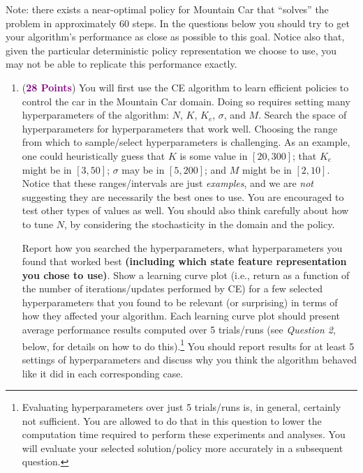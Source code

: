 \documentclass{article}
\newcommand{\POINTS}[1]{\textcolor{purple}{\textbf{{#1}}}}
\begin{document}
\newpage
{}

\vspace{0.2in}
Note: there exists a near-optimal policy for Mountain Car that ``solves'' the problem in approximately 60 steps. In the questions below you should try to get your algorithm's performance as close as possible to this goal. Notice also that, given the particular deterministic policy representation we choose to use, you may not be able to replicate this performance exactly.

\begin{enumerate} 
    \item (\POINTS{28 Points}) You will first use the CE algorithm to learn efficient policies to control the car in the Mountain Car domain. Doing so requires setting many hyperparameters of the algorithm: $N$, $K$, $K_e$, $\sigma$, and $M$. Search the space of hyperparameters for hyperparameters that work well. Choosing the range from which to sample/select  hyperparameters is challenging. As an example, one could heuristically guess that $K$ is some value in $[20, 300]$; that $K_e$ might be in $[3,50]$; $\sigma$ may be in $[5,200]$; and $M$ might be in $[2,10]$. Notice that these ranges/intervals are just \textit{examples}, and we are \textit{not} suggesting they are necessarily the best ones to use. You are encouraged to test other types of values as well. You should also think carefully about how to tune $N$, by considering the stochasticity in the domain and the policy.  
    
    Report how you searched the hyperparameters, what hyperparameters you found that worked best \textbf{(including which state feature representation you chose to use)}. Show a learning curve plot (i.e., return as a function of the number of iterations/updates performed by CE) for a few selected hyperparameters that you found to be relevant (or surprising) in terms of how they affected your algorithm. Each learning curve plot should present average performance results computed over 5 trials/runs (see \textit{Question 2}, below, for details on how to do this).\footnote{Evaluating hyperparameters over just 5 trials/runs is, in general, certainly not sufficient. You are allowed to do that in this question to lower the computation time required to perform these experiments and analyses. You will evaluate your selected solution/policy more accurately in a subsequent question.} You should report results for at least 5 settings of hyperparameters and discuss why you think the algorithm behaved like it did in each corresponding case. 
    

\end{enumerate}
\end{document}
